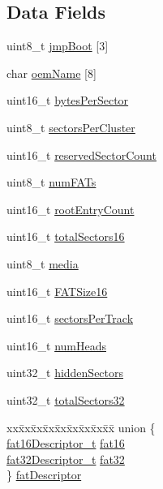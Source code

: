\subsection*{Data Fields}
\begin{DoxyCompactItemize}
\item 
uint8\+\_\+t \hyperlink{structfatVolumeID__t_a3a490e7e4940bdef67b5cb7c73cd5ed6}{jmp\+Boot} \mbox{[}3\mbox{]}
\item 
char \hyperlink{structfatVolumeID__t_a0532233a73387f92364cc1306e330410}{oem\+Name} \mbox{[}8\mbox{]}
\item 
uint16\+\_\+t \hyperlink{structfatVolumeID__t_ac66a1b1c822098ef2a7548b3ff244eae}{bytes\+Per\+Sector}
\item 
uint8\+\_\+t \hyperlink{structfatVolumeID__t_aedf84a83fd87429472e3663fbc8b6acd}{sectors\+Per\+Cluster}
\item 
uint16\+\_\+t \hyperlink{structfatVolumeID__t_a7c8bd52c062e27a5b30cd42c3c63df0f}{reserved\+Sector\+Count}
\item 
uint8\+\_\+t \hyperlink{structfatVolumeID__t_a3911aecd595bdd3a9ac9b9ae39283d6d}{num\+F\+A\+Ts}
\item 
uint16\+\_\+t \hyperlink{structfatVolumeID__t_af101129954d13fa289dfed01bd38d1e9}{root\+Entry\+Count}
\item 
uint16\+\_\+t \hyperlink{structfatVolumeID__t_a66b43acef1c26f30baea7534e99964c2}{total\+Sectors16}
\item 
uint8\+\_\+t \hyperlink{structfatVolumeID__t_a629d1f75103d3a3c165419d2ca5dabb2}{media}
\item 
uint16\+\_\+t \hyperlink{structfatVolumeID__t_ac5bba8baa424b913712a044e979aefca}{F\+A\+T\+Size16}
\item 
uint16\+\_\+t \hyperlink{structfatVolumeID__t_af9a5a0e36bcf0c9e9149ec903561e4aa}{sectors\+Per\+Track}
\item 
uint16\+\_\+t \hyperlink{structfatVolumeID__t_ad7a607df620ef9e7fec45b8e95b20e49}{num\+Heads}
\item 
uint32\+\_\+t \hyperlink{structfatVolumeID__t_aba049832d9975973490427fecfbc32d2}{hidden\+Sectors}
\item 
uint32\+\_\+t \hyperlink{structfatVolumeID__t_a069f2d42bd57ff2515c200429c9cf29e}{total\+Sectors32}
\item 
\begin{tabbing}
xx\=xx\=xx\=xx\=xx\=xx\=xx\=xx\=xx\=\kill
union \{\\
\>\hyperlink{structfat16Descriptor__t}{fat16Descriptor\_t} \hyperlink{structfatVolumeID__t_a2a808b1f87f6de3c84692e329594bace}{fat16}\\
\>\hyperlink{structfat32Descriptor__t}{fat32Descriptor\_t} \hyperlink{structfatVolumeID__t_a483748d922999293fe77642225aa8c23}{fat32}\\
\} \hyperlink{structfatVolumeID__t_ae1f9fd570d1716de9c4c72443aecccac}{fatDescriptor}\\

\end{tabbing}\end{DoxyCompactItemize}


